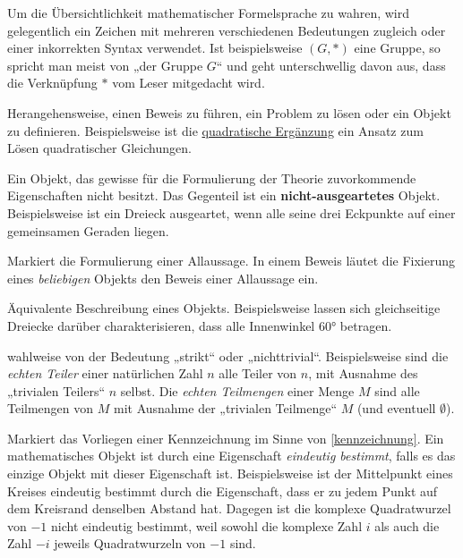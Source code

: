 \begin{description}[labelindent=0pt, leftmargin=0pt]

    \item[abuse of notation:] Um die Übersichtlichkeit mathematischer Formelsprache zu wahren, wird gelegentlich ein Zeichen mit mehreren verschiedenen Bedeutungen zugleich oder einer inkorrekten Syntax verwendet. Ist beispielsweise $(G,*)$ eine Gruppe, so spricht man meist von „der Gruppe $G$“ und geht unterschwellig davon aus, dass die Verknüpfung $*$ vom Leser mitgedacht wird.

    \item[Ansatz:] Herangehensweise, einen Beweis zu führen, ein Problem zu lösen oder ein Objekt zu definieren. Beispielsweise ist die \href{https://en.wikipedia.org/wiki/Completing_the_square}{quadratische Ergänzung} ein Ansatz zum Lösen quadratischer Gleichungen. 
    
    \item[Ausgeartet:] Ein Objekt, das gewisse für die Formulierung der Theorie zuvorkommende Eigenschaften nicht besitzt. Das Gegenteil ist ein \textbf{nicht-ausgeartetes} Objekt. Beispielsweise ist ein Dreieck ausgeartet, wenn alle seine drei Eckpunkte auf einer gemeinsamen Geraden liegen.

    \item[Beliebig:] Markiert die Formulierung einer Allaussage. In einem Beweis läutet die Fixierung eines \emph{beliebigen} Objekts den Beweis einer Allaussage ein.

    \item[Charakterisierung:] Äquivalente Beschreibung eines Objekts. Beispielsweise lassen sich gleichseitige Dreiecke darüber charakterisieren, dass alle Innenwinkel 60° betragen.

    \item[Echt:] wahlweise von der Bedeutung „strikt“ oder „nichttrivial“. Beispielsweise sind die \emph{echten Teiler} einer natürlichen Zahl $n$ alle Teiler von $n$, mit Ausnahme des „trivialen Teilers“ $n$ selbst. Die \emph{echten Teilmengen} einer Menge $M$ sind alle Teilmengen von $M$ mit Ausnahme der „trivialen Teilmenge“ $M$ (und eventuell $\emptyset$).

    \item[Eindeutig bestimmt:] Markiert das Vorliegen einer Kennzeichnung im Sinne von \cref{kennzeichnung}. Ein mathematisches Objekt ist durch eine Eigenschaft \emph{eindeutig bestimmt}, falls es das einzige Objekt mit dieser Eigenschaft ist. Beispielsweise ist der Mittelpunkt eines Kreises eindeutig bestimmt durch die Eigenschaft, dass er zu jedem Punkt auf dem Kreisrand denselben Abstand hat. Dagegen ist die komplexe Quadratwurzel von $-1$ nicht eindeutig bestimmt, weil sowohl die komplexe Zahl $i$ als auch die Zahl $-i$ jeweils Quadratwurzeln von $-1$ sind.
    

\end{description}
